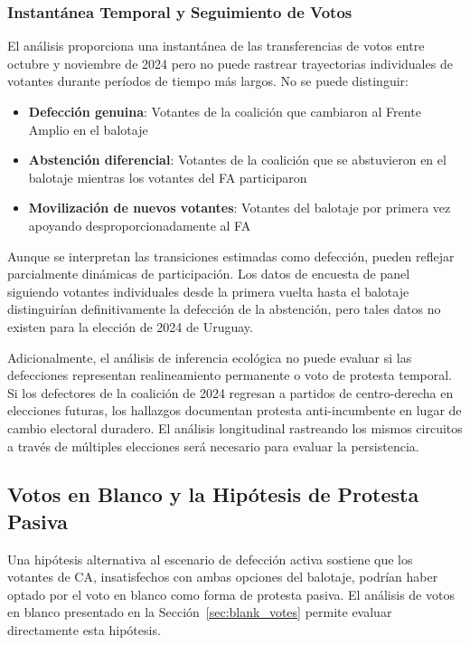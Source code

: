 \subsubsection{Instantánea Temporal y Seguimiento de Votos}

El análisis proporciona una instantánea de las transferencias de votos entre octubre y noviembre de 2024 pero no puede rastrear trayectorias individuales de votantes durante períodos de tiempo más largos. No se puede distinguir:

\begin{itemize}
    \item \textbf{Defección genuina}: Votantes de la coalición que cambiaron al Frente Amplio en el balotaje
    \item \textbf{Abstención diferencial}: Votantes de la coalición que se abstuvieron en el balotaje mientras los votantes del FA participaron
    \item \textbf{Movilización de nuevos votantes}: Votantes del balotaje por primera vez apoyando desproporcionadamente al FA
\end{itemize}

Aunque se interpretan las transiciones estimadas como defección, pueden reflejar parcialmente dinámicas de participación. Los datos de encuesta de panel siguiendo votantes individuales desde la primera vuelta hasta el balotaje distinguirían definitivamente la defección de la abstención, pero tales datos no existen para la elección de 2024 de Uruguay.

Adicionalmente, el análisis de inferencia ecológica no puede evaluar si las defecciones representan realineamiento permanente o voto de protesta temporal. Si los defectores de la coalición de 2024 regresan a partidos de centro-derecha en elecciones futuras, los hallazgos documentan protesta anti-incumbente en lugar de cambio electoral duradero. El análisis longitudinal rastreando los mismos circuitos a través de múltiples elecciones será necesario para evaluar la persistencia.

\subsection{Votos en Blanco y la Hipótesis de Protesta Pasiva}
\label{sec:discusion_blancos}

Una hipótesis alternativa al escenario de defección activa sostiene que los votantes de CA, insatisfechos con ambas opciones del balotaje, podrían haber optado por el voto en blanco como forma de protesta pasiva. El análisis de votos en blanco presentado en la Sección~\ref{sec:blank_votes} permite evaluar directamente esta hipótesis.

